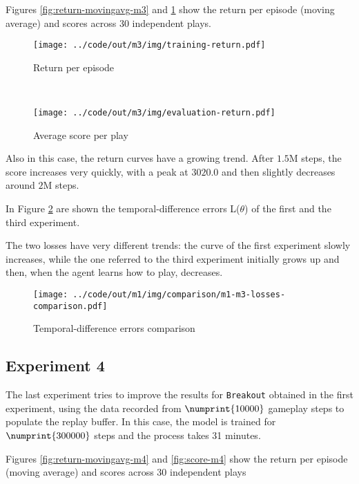 \documentclass[a4paper,12pt]{article} %
\begin{document}
	Figures \ref{fig:return-movingavg-m3} and \ref{fig:score-m3} show the return per episode (moving average) and scores across 30 independent plays.
	\begin{figure}[htb]
		\begin{minipage}[b]{.49\textwidth}
			\centering
			\texttt{[image: ../code/out/m3/img/training-return.pdf]}	
			\caption{Return per episode}
			\label{fig:return-movingavg-m3}
		\end{minipage}
		~
		\begin{minipage}[b]{.49\textwidth}
			\centering
			\texttt{[image: ../code/out/m3/img/evaluation-return.pdf]}	
			\caption{Average score per play}
			\label{fig:score-m3}
		\end{minipage}
	\end{figure}
	
	Also in this case, the return curves have a growing trend. After $1.5 \mathrm{M}$ steps, the score increases very quickly, with a peak at $3020.0$ and then slightly decreases around $2 \mathrm{M}$ steps.\bigskip
	
	In Figure \ref{fig:loss-m1-m3} are shown the temporal-difference errors L($\theta$) of the first and the third experiment.

	The two losses have very different trends: the curve of the first experiment slowly increases, while the one referred to the third experiment initially grows up and then, when the agent learns how to play, decreases.

	\begin{figure}[htb]
		\centering
		\texttt{[image: ../code/out/m1/img/comparison/m1-m3-losses-comparison.pdf]}	
		\caption{Temporal-difference errors comparison}
		\label{fig:loss-m1-m3}
	\end{figure}

	
	\subsection*{Experiment 4}
	The last experiment tries to improve the results for \texttt{Breakout} obtained in the first experiment, using the data recorded from $\numprint{10000}$ gameplay steps to populate the replay buffer.
	In this case, the model is trained for $\numprint{300000}$ steps and the process takes 31 minutes.
	\bigskip

	Figures \ref{fig:return-movingavg-m4} and \ref{fig:score-m4} show the return per episode (moving average) and scores across 30 independent plays
	
\end{document}
